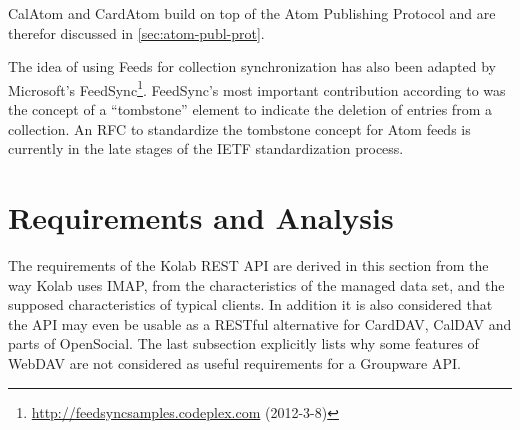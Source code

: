 \documentclass[11pt,a4paper,headsepline,twoside]{scrartcl}		%
\newcommand{\citeurl}[2]{\url{#1} (#2)}
\begin{document}
CalAtom and CardAtom build on top of the Atom Publishing Protocol and are
therefor discussed in \autoref{sec:atom-publ-prot}.

The idea of using Feeds for collection synchronization has also been adapted by
Microsoft's
FeedSync\footnote{\citeurl{http://feedsyncsamples.codeplex.com}{2012-3-8}}. FeedSync's
most important contribution according to \cite{Snell2007} was the concept of a
``tombstone'' element to indicate the deletion of entries from a collection. An
RFC to standardize the tombstone concept \cite{draft-snell-atompub-tombstones-14}
for Atom feeds is currently in the late stages of the IETF standardization
process.

\section{Requirements and Analysis}
\label{sec:requ-analys}

The requirements of the Kolab REST API are derived in this section from the way
Kolab uses IMAP, from the characteristics of the managed data set, and the
supposed characteristics of typical clients. In addition it is also considered
that the API may even be usable as a RESTful alternative for CardDAV, CalDAV and
parts of OpenSocial. The last subsection explicitly lists why some features of
WebDAV are not considered as useful requirements for a Groupware API.



\end{document}
